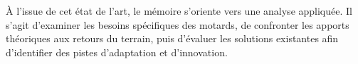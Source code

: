 À l’issue de cet état de l’art, le mémoire s’oriente vers une analyse appliquée. Il s’agit d’examiner les besoins spécifiques des motards, de confronter les apports théoriques aux retours du terrain, puis d’évaluer les solutions existantes afin d’identifier des pistes d’adaptation et d’innovation.